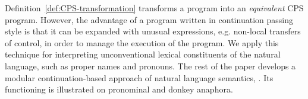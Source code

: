 Definition~\ref{def:CPS-transformation} transforms a program into an \emph{equivalent} CPS program. However, the advantage of a program written in continuation passing style is that it can be expanded with unusual expressions, e.g. non-local transfers of control, in order to manage the execution of the program. We apply this technique for interpreting unconventional lexical constituents of the natural language, such as proper names and pronouns. The rest of the paper develops a modular continuation-based approach of natural language semantics, {\FullName}. Its functioning is illustrated on pronominal and donkey anaphora.

